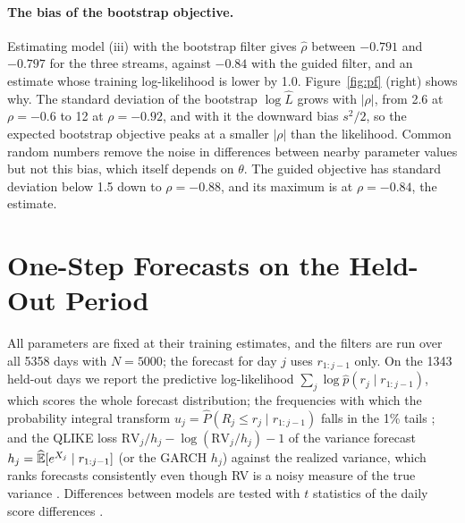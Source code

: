 \paragraph{The bias of the bootstrap objective.} Estimating model (iii) with the bootstrap filter gives $\hat\rho$ between $-0.791$ and $-0.797$ for the three streams, against $-0.84$ with the guided filter, and an estimate whose training log-likelihood is lower by 1.0. Figure~\ref{fig:pf} (right) shows why. The standard deviation of the bootstrap $\log\hat L$ grows with $|\rho|$, from 2.6 at $\rho = -0.6$ to 12 at $\rho = -0.92$, and with it the downward bias $s^2/2$, so the expected bootstrap objective peaks at a smaller $|\rho|$ than the likelihood. Common random numbers remove the noise in differences between nearby parameter values but not this bias, which itself depends on $\theta$. The guided objective has standard deviation below 1.5 down to $\rho = -0.88$, and its maximum is at $\rho = -0.84$, the estimate.

\section{One-Step Forecasts on the Held-Out Period}
\label{sec:forecasts}

All parameters are fixed at their training estimates, and the filters are run over all 5358 days with $N = 5000$; the forecast for day $j$ uses $r_{1:j-1}$ only. On the 1343 held-out days we report the predictive log-likelihood $\sum_j \log\hat p(r_j \mid r_{1:j-1})$, which scores the whole forecast distribution; the frequencies with which the probability integral transform $u_j = \hat P(R_j \le r_j \mid r_{1:j-1})$ falls in the 1\% tails \cite{dieboldGuntherTay1998}; and the QLIKE loss $\mathrm{RV}_j/h_j - \log(\mathrm{RV}_j/h_j) - 1$ of the variance forecast $h_j = \widehat{\operatorname{\mathbb{E}}}[e^{X_j} \mid r_{1:j-1}]$ (or the GARCH $h_j$) against the realized variance, which ranks forecasts consistently even though RV is a noisy measure of the true variance \cite{patton2011}. Differences between models are tested with $t$ statistics of the daily score differences \cite{dieboldMariano1995}.

